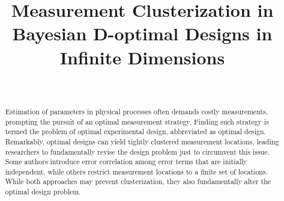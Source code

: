 \documentclass[ba]{imsart}
\theoremstyle{plain}
\theoremstyle{definition}
\theoremstyle{remark}
\begin{document}
\begin{frontmatter}
  \title{Measurement Clusterization in Bayesian D-optimal Designs in Infinite Dimensions}
  

\begin{aug}
\author[A]{~}
\address[A]{Azrieli Faculty of Medicine, Bar-Ilan University 
}

\end{aug}

\begin{abstract}
  Estimation of parameters in physical processes often demands costly
  measurements, prompting the pursuit of an optimal measurement
  strategy. Finding such strategy is termed the problem of optimal
  experimental design, abbreviated as optimal design. Remarkably,
  optimal designs can yield tightly clustered measurement locations,
  leading researchers to fundamentally revise the design problem just
  to circumvent this issue. Some authors introduce error correlation
  among error terms that are initially independent, while others
  restrict measurement locations to a finite set of locations. While
  both approaches may prevent clusterization, they also fundamentally
  alter the optimal design problem.


\end{abstract}
\end{frontmatter}
\end{document}
